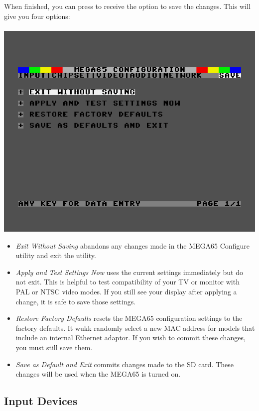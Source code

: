 \begin{minipage}{\linewidth}
  When finished, you can press  to receive the
  option to save the changes. This will give you four options: \\
  \\
  \includegraphics[width=\linewidth]{images/ss-m65config-save.png}
\end{minipage}

\begin{itemize}
  \item{\em Exit Without Saving} abandons any changes made in the MEGA65 Configure utility and exit the utility.
  \item{\em Apply and Test Settings Now} uses the current settings immediately but do not exit. This is helpful to test compatibility of your TV or monitor with PAL or NTSC video modes. If you still see your display after applying a change, it is safe to save those settings.
  \item{\em Restore Factory Defaults} resets the MEGA65 configuration settings to the factory defaults. It wukk randomly select a new MAC address for models that include an internal Ethernet adaptor. If you wish to commit these changes, you must still save them.
  \item{\em Save as Default and Exit} commits changes made to the SD card. These changes will be used when the MEGA65 is turned on.
\end{itemize}

\subsection{Input Devices}


